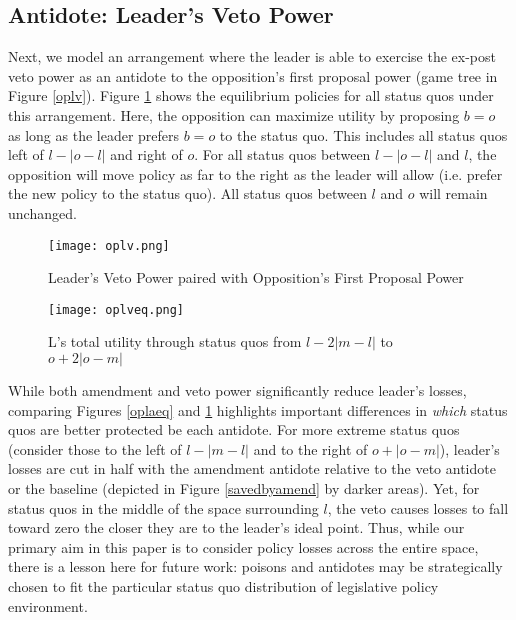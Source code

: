 \documentclass[12pt]{article}
\theoremstyle{plain}		      \newtheorem{assn}{Assumption}
\theoremstyle{plain}		      \newtheorem{prop}{Proposition}
\theoremstyle{plain}		      \newtheorem{lemma}{Lemma}
\theoremstyle{plain}	          \newtheorem{imp}{Implication}
\theoremstyle{plain}	          \newtheorem{hyp}{Hypothesis}
\theoremstyle{definition}		  \newtheorem{defn}{Definition}
\theoremstyle{remark}	          \newtheorem{rem}{Remark}
\theoremstyle{definition}         \newtheorem{case}{Case}
\begin{document}
\subsection{Antidote: Leader's Veto Power}
\indent Next, we model an arrangement where the leader is able to exercise the ex-post veto power as an antidote to the opposition's first proposal power (game tree in Figure \ref{oplv}). Figure \ref{oplveq} shows the equilibrium policies for all status quos under this arrangement. Here, the opposition can maximize utility by proposing $b=o$ as long as the leader prefers $b=o$ to the status quo. This includes all status quos left of $l-|o-l|$ and right of $o$. For all status quos between $l-|o-l|$ and $l$, the opposition will move policy as far to the right as the leader will allow (i.e. prefer the new policy to the status quo). All status quos between $l$ and $o$ will remain unchanged.    
\begin{figure}[h]
  \centering
  \begin{minipage}[b]{0.3\textwidth}
    \texttt{[image: oplv.png]}
    \caption{Leader's Veto Power paired with Opposition's First Proposal Power}
    \label{oplv}
  \end{minipage}
  \hfill
  \begin{minipage}[b]{0.6\textwidth}
    \texttt{[image: oplveq.png]}
    \caption{L's total utility through status quos from \newline $l-2|m-l|$ to $o+2|o-m|$}
    \label{oplveq}
  \end{minipage}
\end{figure}
\FloatBarrier

\indent While both amendment and veto power significantly reduce leader's losses, comparing Figures \ref{oplaeq} and \ref{oplveq} highlights important differences in \textit{which} status quos are better protected be each antidote. For more extreme status quos (consider those to the left of $l-|m-l|$ and to the right of $o+|o-m|$), leader's losses are cut in half with the amendment antidote relative to the veto antidote or the baseline (depicted in Figure \ref{savedbyamend} by darker areas). Yet, for status quos in the middle of the space surrounding $l$, the veto causes losses to fall toward zero the closer they are to the leader's ideal point. Thus, while our primary aim in this paper is to consider policy losses across the entire space, there is a lesson here for future work: poisons and antidotes may be strategically chosen to fit the particular status quo distribution of legislative policy environment.
\end{document}

